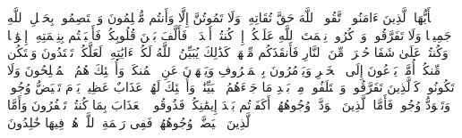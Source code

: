 \stopbuffer
\startbuffer[\q:3:102]
یَٰۤأَیُّهَا ٱلَّذِینَ ءَامَنُوا۟ ٱتَّقُوا۟ ٱللَّهَ حَقَّ تُقَاتِهِۦ وَلَا تَمُوتُنَّ إِلَّا وَأَنتُم مُّسۡلِمُونَ%
\stopbuffer
\startbuffer[\q:3:103]
وَٱعۡتَصِمُوا۟ بِحَبۡلِ ٱللَّهِ جَمِیعࣰا وَلَا تَفَرَّقُوا۟ۚ وَٱذۡكُرُوا۟ نِعۡمَتَ ٱللَّهِ عَلَیۡكُمۡ إِذۡ كُنتُمۡ أَعۡدَاۤءࣰ فَأَلَّفَ بَیۡنَ قُلُوبِكُمۡ فَأَصۡبَحۡتُم بِنِعۡمَتِهِۦۤ إِخۡوَٰنࣰا وَكُنتُمۡ عَلَىٰ شَفَا حُفۡرَةࣲ مِّنَ ٱلنَّارِ فَأَنقَذَكُم مِّنۡهَاۗ كَذَٰلِكَ یُبَیِّنُ ٱللَّهُ لَكُمۡ ءَایَٰتِهِۦ لَعَلَّكُمۡ تَهۡتَدُونَ%
\stopbuffer
\startbuffer[\q:3:104]
وَلۡتَكُن مِّنكُمۡ أُمَّةࣱ یَدۡعُونَ إِلَى ٱلۡخَیۡرِ وَیَأۡمُرُونَ بِٱلۡمَعۡرُوفِ وَیَنۡهَوۡنَ عَنِ ٱلۡمُنكَرِۚ وَأُو۟لَٰۤئِكَ هُمُ ٱلۡمُفۡلِحُونَ%
\stopbuffer
\startbuffer[\q:3:105]
وَلَا تَكُونُوا۟ كَٱلَّذِینَ تَفَرَّقُوا۟ وَٱخۡتَلَفُوا۟ مِنۢ بَعۡدِ مَا جَاۤءَهُمُ ٱلۡبَیِّنَٰتُۚ وَأُو۟لَٰۤئِكَ لَهُمۡ عَذَابٌ عَظِیمࣱ%
\stopbuffer
\startbuffer[\q:3:106]
یَوۡمَ تَبۡیَضُّ وُجُوهࣱ وَتَسۡوَدُّ وُجُوهࣱۚ فَأَمَّا ٱلَّذِینَ ٱسۡوَدَّتۡ وُجُوهُهُمۡ أَكَفَرۡتُم بَعۡدَ إِیمَٰنِكُمۡ فَذُوقُوا۟ ٱلۡعَذَابَ بِمَا كُنتُمۡ تَكۡفُرُونَ%
\stopbuffer
\startbuffer[\q:3:107]
وَأَمَّا ٱلَّذِینَ ٱبۡیَضَّتۡ وُجُوهُهُمۡ فَفِی رَحۡمَةِ ٱللَّهِۖ هُمۡ فِیهَا خَٰلِدُونَ%
\stopbuffer

